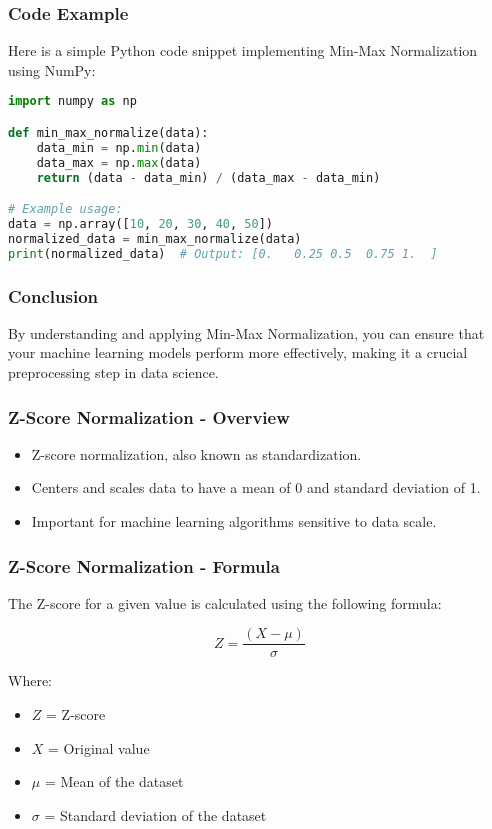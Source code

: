 \documentclass[aspectratio=169]{beamer}
\begin{document}
\begin{frame}[fragile]
    \frametitle{Code Example}
    Here is a simple Python code snippet implementing Min-Max Normalization using NumPy:
    
    \begin{lstlisting}[language=Python]
import numpy as np

def min_max_normalize(data):
    data_min = np.min(data)
    data_max = np.max(data)
    return (data - data_min) / (data_max - data_min)

# Example usage:
data = np.array([10, 20, 30, 40, 50])
normalized_data = min_max_normalize(data)
print(normalized_data)  # Output: [0.   0.25 0.5  0.75 1.  ]
    \end{lstlisting}
\end{frame}

\begin{frame}[fragile]
    \frametitle{Conclusion}
    By understanding and applying Min-Max Normalization, you can ensure that your machine learning models perform more effectively, making it a crucial preprocessing step in data science.
\end{frame}

\begin{frame}[fragile]
    \frametitle{Z-Score Normalization - Overview}
    \begin{itemize}
        \item Z-score normalization, also known as standardization.
        \item Centers and scales data to have a mean of 0 and standard deviation of 1.
        \item Important for machine learning algorithms sensitive to data scale.
    \end{itemize}
\end{frame}

\begin{frame}[fragile]
    \frametitle{Z-Score Normalization - Formula}
    The Z-score for a given value is calculated using the following formula:
    
    \begin{equation}
        Z = \frac{(X - \mu)}{\sigma}
    \end{equation}
    
    Where:
    \begin{itemize}
        \item \( Z \) = Z-score
        \item \( X \) = Original value
        \item \( \mu \) = Mean of the dataset
        \item \( \sigma \) = Standard deviation of the dataset
    \end{itemize}
\end{frame}
\end{document}
